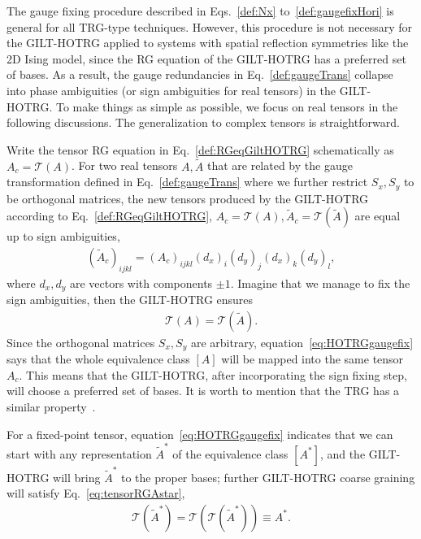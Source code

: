 \documentclass[aps,prr,reprint,superscriptaddress,floatfix]{revtex4-2}
\begin{document}
The gauge fixing procedure described in Eqs.~\eqref{def:Nx} to~\eqref{def:gaugefixHori} is general for all TRG-type techniques.
However, this procedure is not necessary for the GILT-HOTRG applied to systems with spatial reflection symmetries like the 2D Ising model, since the RG equation of the GILT-HOTRG has a preferred set of bases.
As a result, the gauge redundancies in Eq.~\eqref{def:gaugeTrans} collapse into phase ambiguities (or sign ambiguities for real tensors) in the GILT-HOTRG\@.
To make things as simple as possible, we focus on real tensors in the following discussions.
The generalization to complex tensors is straightforward.
%

Write the tensor RG equation in Eq.~\eqref{def:RGeqGiltHOTRG} schematically as $A_c = \mathcal{T}\left(A\right)$.
For two real tensors $A, \tilde{A}$ that are related by the gauge transformation defined in Eq.~\eqref{def:gaugeTrans} where we further restrict $S_x,S_y$ to be orthogonal matrices, the new tensors produced by the GILT-HOTRG according to Eq.~\eqref{def:RGeqGiltHOTRG}, $A_c = \mathcal{T}\left(A\right), \tilde{A}_c = \mathcal{T}(\tilde{A})$ are equal up to sign ambiguities,
%
\begin{align}\label{eq:signAmbi}
    \left(\tilde{A}_c \right)_{ijkl} =
    \left(A_c\right)_{ijkl}(d_x)_i (d_y)_j (d_x)_k (d_y)_l, 
\end{align}
%
where $d_x,d_y$ are vectors with components $\pm 1$. 
Imagine that we manage to fix the sign ambiguities, then the GILT-HOTRG ensures
%
\begin{align}\label{eq:HOTRGgaugefix}
    \mathcal{T}(A) = \mathcal{T}(\tilde{A}).
\end{align}
%
Since the orthogonal matrices $S_x, S_y$ are arbitrary, equation~\eqref{eq:HOTRGgaugefix} says that the whole equivalence class $[A]$ will be mapped into the same tensor $A_c$. 
This means that the GILT-HOTRG, after incorporating the sign fixing step, will choose a preferred set of bases. 
It is worth to mention that the TRG has a similar property~\cite{kadanoff2014}.
%

For a fixed-point tensor, equation~\eqref{eq:HOTRGgaugefix} indicates that we can start with any representation $\tilde{A}^*$ of the equivalence class $[A^*]$, and the GILT-HOTRG will bring $\tilde{A}^*$ to the proper bases; further GILT-HOTRG coarse graining will satisfy Eq.~\eqref{eq:tensorRGAstar},
%
\begin{align}\label{eq:GiltHOTRGfixT}
    \mathcal{T}(\tilde{A}^*) =
    \mathcal{T}\left(\mathcal{T}(\tilde{A}^*)  \right) \equiv A^*.
\end{align}
%
\end{document}
